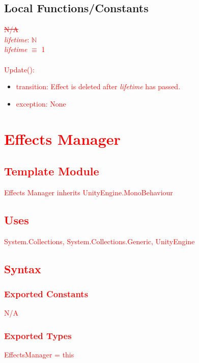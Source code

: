 \documentclass[12pt]{article}
\begin{document}
\subsection{Local Functions/Constants}
\textcolor{red}{\sout{N/A}}\\
\textcolor{red}{\textit{lifetime}: $\mathbb{N}$}\\
\textcolor{red}{\textit{lifetime} $\equiv$ 1}\\\\

\noindent \textcolor{red}{Update():}
\begin{itemize}
	\item \textcolor{red}{transition: Effect is deleted after \textit{lifetime} has passed.}
	\item \textcolor{red}{exception: None}
\end{itemize}

\newpage
\section{\textcolor{red}{Effects Manager}}

\subsection{\textcolor{red}{Template Module}}
\textcolor{red}{Effects Manager inherits UnityEngine.MonoBehaviour}

\subsection{\textcolor{red}{Uses}}
\textcolor{red}{System.Collections, System.Collections.Generic, UnityEngine}

\subsection{\textcolor{red}{Syntax}}

\subsubsection {\textcolor{red}{Exported Constants}}
\textcolor{red}{N/A}

\subsubsection {\textcolor{red}{Exported Types}}
\textcolor{red}{EffectsManager = this}
\end{document}
